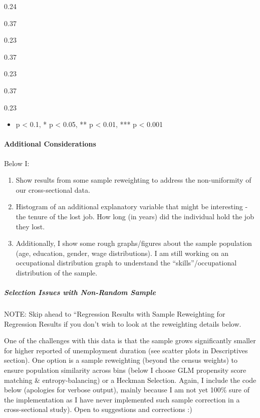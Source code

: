 0.24

0.37

0.23

0.37

0.23

0.37

0.23

\begin{itemize}
\tightlist
\item
  p \textless{} 0.1, * p \textless{} 0.05, ** p \textless{} 0.01, *** p
  \textless{} 0.001
\end{itemize}

\paragraph{Additional Considerations}\label{additional-considerations}

Below I:

\begin{enumerate}
\def\labelenumi{\arabic{enumi}.}
\tightlist
\item
  Show results from some sample reweighting to address the
  non-uniformity of our cross-sectional data.
\item
  Histogram of an additional explanatory variable that might be
  interesting - the tenure of the lost job. How long (in years) did the
  individual hold the job they lost.
\item
  Additionally, I show some rough graphs/figures about the sample
  population (age, education, gender, wage distributions). I am still
  working on an occupational distribution graph to understand the
  ``skills''/occupational distribution of the sample.
\end{enumerate}

\subparagraph{Selection Issues with Non-Random
Sample}\label{selection-issues-with-non-random-sample}

NOTE: Skip ahead to ``Regression Results with Sample Reweighting for
Regression Results if you don't wish to look at the reweighting details
below.

One of the challenges with this data is that the sample grows
significantly smaller for higher reported of unemployment duration (see
scatter plots in Descriptives section). One option is a sample
reweighting (beyond the census weights) to ensure population similarity
across bins (below I choose GLM propensity score matching \&
entropy-balancing) or a Heckman Selection. Again, I include the code
below (apologies for verbose output), mainly because I am not yet 100\%
sure of the implementation as I have never implemented such sample
correction in a cross-sectional study). Open to suggestions and
corrections :)


